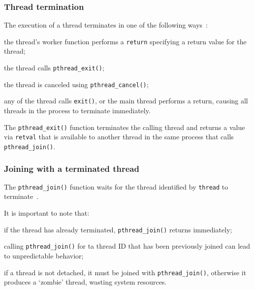 \subsubsection{Thread termination}
\label{sec:thread-termination}
The execution of a thread terminates in one of the following
ways~\cite{kerrisk2010linux}:
\begin{item-c}
\item the thread's worker function performs a \texttt{return} specifying a
  return value for the thread;
\item the thread calls \texttt{pthread\_exit()};
\item the thread is canceled using \texttt{pthread\_cancel()};
\item any of the thread calls \texttt{exit()}, or the main thread performs a
  return, causing all threads in the process to terminate immediately.
\end{item-c}

The \texttt{pthread\_exit()} function terminates the calling thread and returns a
value via \texttt{retval} that is available to another thread in the same
process that calls \texttt{pthread\_join()}.


\subsubsection{Joining with a terminated thread}
\label{sec:join-with-term}
The \texttt{pthread\_join()} function waits for the thread identified by
\texttt{thread} to terminate~\cite{kerrisk2010linux}.
%

%
It is important to note that:
\begin{item-c}
\item if the thread has already terminated, \texttt{pthread\_join()} returns
  immediately;
\item calling \texttt{pthread\_join()} for ta thread ID that has been previously
  joined can lead to unpredictable behavior;
\item if a thread is not detached, it must be joined with
  \texttt{pthread\_join()}, otherwise it produces a `zombie' thread, wasting
  system resources.
\end{item-c}

